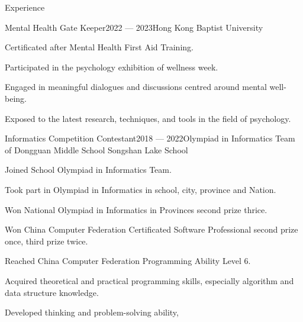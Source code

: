 \documentclass[
	11pt, %
]{resume} %
\begin{document}
\begin{rSection}{Experience}
    \begin{rSubsection}{Mental Health Gate Keeper}{2022 --- 2023}{Hong Kong Baptist University}{}
        \item Certificated after Mental Health First Aid Training.
        \item Participated in the psychology exhibition of wellness week.
        \item Engaged in meaningful dialogues and discussions centred around mental well-being.
        \item Exposed to the latest research, techniques, and tools in the field of psychology.
    \end{rSubsection}


    \begin{rSubsection}{Informatics Competition Contestant}{2018 --- 2022}{Olympiad in Informatics Team of Dongguan Middle School Songshan Lake School}{}
        \item Joined School Olympiad in Informatics Team.
        \item Took part in Olympiad in Informatics in school, city, province and Nation.
        \item Won National Olympiad in Informatics in Provinces second prize thrice.
        \item Won China Computer Federation Certificated Software Professional second prize once, third prize twice.
        \item Reached China Computer Federation Programming Ability Level 6.
        \item Acquired theoretical and practical programming skills, especially algorithm and data structure knowledge.
        \item Developed thinking and problem-solving ability,
    \end{rSubsection}

\end{rSection}
\end{document}
